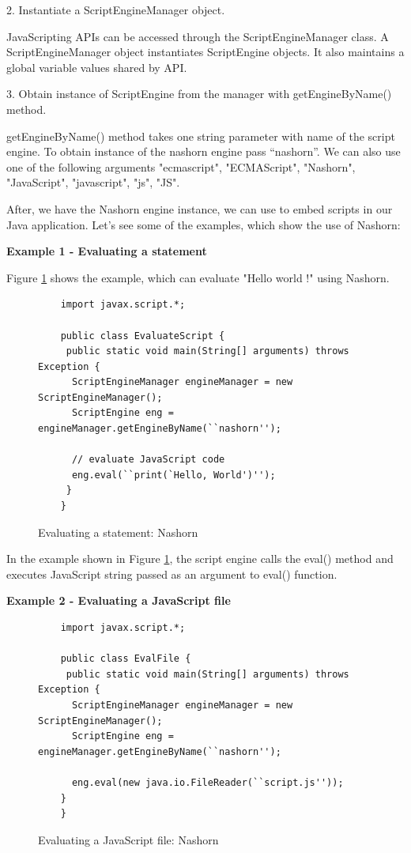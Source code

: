 2.	Instantiate a ScriptEngineManager object.

JavaScripting APIs can be accessed through the ScriptEngineManager class. A ScriptEngineManager object instantiates ScriptEngine objects. It also maintains a global variable values shared by API. 

3.	Obtain instance of ScriptEngine from the manager with getEngineByName() method.

getEngineByName() method takes one string parameter with name of the script engine. To obtain instance of the nashorn engine pass “nashorn”. We can also use one of the following arguments "ecmascript", "ECMAScript", "Nashorn", "JavaScript", "javascript", "js", "JS".
 
After, we have the Nashorn engine instance, we can use to embed scripts in our Java application. Let's see some of the examples, which show the use of Nashorn:

\textbf{Example 1 - Evaluating a statement}

Figure \ref{fig:nashornevalastatement} shows the example, which can evaluate "Hello world !" using Nashorn.

\begin{figure}[ht]
	\begin{lstlisting}
	import javax.script.*;
	
	public class EvaluateScript {
	 public static void main(String[] arguments) throws Exception {
	  ScriptEngineManager engineManager = new ScriptEngineManager();
	  ScriptEngine eng = engineManager.getEngineByName(``nashorn'');
	
	  // evaluate JavaScript code
	  eng.eval(``print(`Hello, World')'');
	 }
	}
	\end{lstlisting}
	\caption{Evaluating a statement: Nashorn}
	\label{fig:nashornevalastatement}
\end{figure}

In the example shown in Figure \ref{fig:nashornevalastatement}, the script engine calls the eval() method and executes JavaScript string passed as an argument to eval() function. 

\textbf{Example 2 - Evaluating a JavaScript file}


\begin{figure}[ht]
	\begin{lstlisting}
	import javax.script.*;
	
	public class EvalFile {
	 public static void main(String[] arguments) throws Exception {
	  ScriptEngineManager engineManager = new ScriptEngineManager();
	  ScriptEngine eng = engineManager.getEngineByName(``nashorn'');
	
	  eng.eval(new java.io.FileReader(``script.js''));
	}
	}
	\end{lstlisting}
	\caption{Evaluating a JavaScript file: Nashorn}
	\label{fig:nashornevalafile}
\end{figure}


